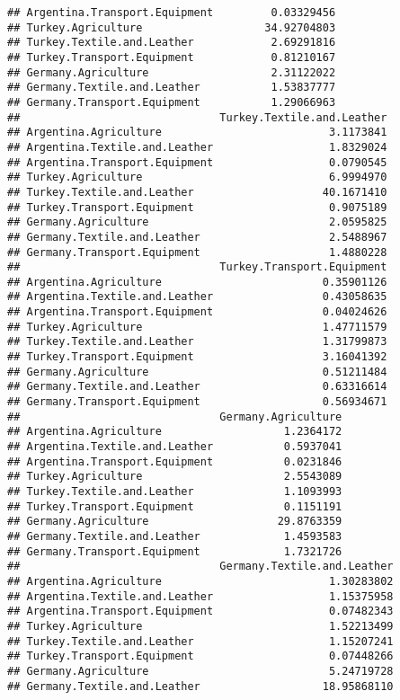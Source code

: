 \documentclass{article}\usepackage[]{graphicx}\usepackage[]{color}
\makeatletter
\newenvironment{kframe}{%
 \def\at@end@of@kframe{}%
 \ifinner\ifhmode%
  \def\at@end@of@kframe{\end{minipage}}%
  \begin{minipage}{\columnwidth}%
 \fi\fi%
 \def\FrameCommand##1{\hskip\@totalleftmargin \hskip-\fboxsep
 \colorbox{shadecolor}{##1}\hskip-\fboxsep
     \hskip-\linewidth \hskip-\@totalleftmargin \hskip\columnwidth}%
 \MakeFramed {\advance\hsize-\width
   \@totalleftmargin\z@ \linewidth\hsize
   \@setminipage}}%
 {\par\unskip\endMakeFramed%
 \at@end@of@kframe}
\newenvironment{knitrout}{}{} %
\makeatother
\begin{document}
\begin{knitrout}
\begin{kframe}
\begin{verbatim}
## Argentina.Transport.Equipment         0.03329456
## Turkey.Agriculture                   34.92704803
## Turkey.Textile.and.Leather            2.69291816
## Turkey.Transport.Equipment            0.81210167
## Germany.Agriculture                   2.31122022
## Germany.Textile.and.Leather           1.53837777
## Germany.Transport.Equipment           1.29066963
##                               Turkey.Textile.and.Leather
## Argentina.Agriculture                          3.1173841
## Argentina.Textile.and.Leather                  1.8329024
## Argentina.Transport.Equipment                  0.0790545
## Turkey.Agriculture                             6.9994970
## Turkey.Textile.and.Leather                    40.1671410
## Turkey.Transport.Equipment                     0.9075189
## Germany.Agriculture                            2.0595825
## Germany.Textile.and.Leather                    2.5488967
## Germany.Transport.Equipment                    1.4880228
##                               Turkey.Transport.Equipment
## Argentina.Agriculture                         0.35901126
## Argentina.Textile.and.Leather                 0.43058635
## Argentina.Transport.Equipment                 0.04024626
## Turkey.Agriculture                            1.47711579
## Turkey.Textile.and.Leather                    1.31799873
## Turkey.Transport.Equipment                    3.16041392
## Germany.Agriculture                           0.51211484
## Germany.Textile.and.Leather                   0.63316614
## Germany.Transport.Equipment                   0.56934671
##                               Germany.Agriculture
## Argentina.Agriculture                   1.2364172
## Argentina.Textile.and.Leather           0.5937041
## Argentina.Transport.Equipment           0.0231846
## Turkey.Agriculture                      2.5543089
## Turkey.Textile.and.Leather              1.1093993
## Turkey.Transport.Equipment              0.1151191
## Germany.Agriculture                    29.8763359
## Germany.Textile.and.Leather             1.4593583
## Germany.Transport.Equipment             1.7321726
##                               Germany.Textile.and.Leather
## Argentina.Agriculture                          1.30283802
## Argentina.Textile.and.Leather                  1.15375958
## Argentina.Transport.Equipment                  0.07482343
## Turkey.Agriculture                             1.52213499
## Turkey.Textile.and.Leather                     1.15207241
## Turkey.Transport.Equipment                     0.07448266
## Germany.Agriculture                            5.24719728
## Germany.Textile.and.Leather                   18.95868110

\end{verbatim}
\end{kframe}
\end{knitrout}
\end{document}

